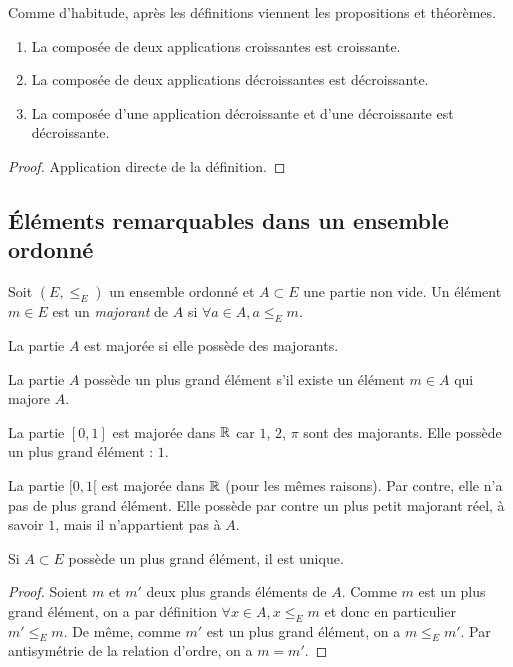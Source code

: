 Comme d'habitude, après les définitions viennent les propositions et théorèmes.

\begin{proposition}
\begin{enumerate}
\item La composée de deux applications croissantes est croissante.
\item La composée de deux applications décroissantes est décroissante.
\item La composée d'une application décroissante et d'une décroissante est décroissante.
\end{enumerate}
\end{proposition}

\begin{proof}
Application directe de la définition.
\end{proof}

\subsection{Éléments remarquables dans un ensemble ordonné}

Soit $(E,\leq_E)$ un ensemble ordonné et $A\subset E$ une partie non vide. Un élément $m\in E$ est un \emph{majorant} de $A$ si $\forall a\in A, a\leq_E m$.

La partie $A$ est majorée si elle possède des majorants.

La partie $A$ possède un plus grand élément s'il existe un élément $m\in A$ qui majore $A$.

\begin{exemple}
La partie $[0,1]$ est majorée dans $\mathbb{R}$ car $1$, $2$, $\pi$ sont des majorants. Elle possède un plus grand élément : $1$.

La partie $[0,1[$ est majorée dans $\mathbb{R}$ (pour les mêmes raisons). Par contre, elle n'a pas de plus grand élément. Elle possède par contre un plus petit majorant réel, à savoir $1$, mais il n'appartient pas à  $A$.
\end{exemple}

\begin{proposition}
Si $A\subset E$ possède un plus grand élément, il est unique.
\end{proposition}
\begin{proof}
Soient $m$ et $m'$ deux plus grands éléments de $A$. Comme $m$ est un plus grand élément, on a par définition $\forall x\in A, x\leq_E m$ et donc en particulier $m'\leq_E m$. De même, comme $m'$ est un plus grand élément, on a $m\leq_E m'$. Par antisymétrie de la relation d'ordre, on a $m=m'$.
\end{proof}

